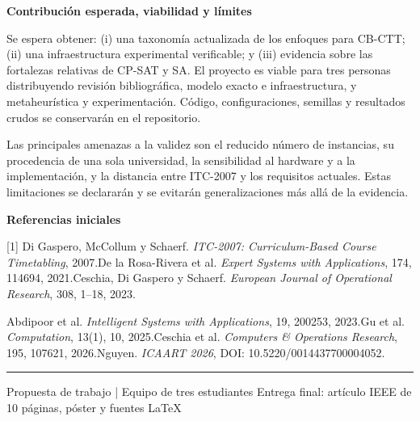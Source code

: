 \documentclass[10pt]{article}
\newcommand{\sectiontitle}[1]{%
  \vspace{1.2mm}%
  {\color{burdeos}\fontsize{11.5}{13}\selectfont\bfseries #1}\par
  \vspace{0.4mm}{\color{burdeos}\rule{\linewidth}{0.75pt}}\vspace{0.5mm}
}
\begin{document}
\begin{minipage}[t][\textheight][t]{\textwidth}
\sectiontitle{Contribuci\'on esperada, viabilidad y l\'imites}
Se espera obtener: (i) una taxonom\'ia actualizada de los enfoques para CB-CTT; (ii) una infraestructura experimental verificable; y (iii) evidencia sobre las fortalezas relativas de CP-SAT y SA. El proyecto es viable para tres personas distribuyendo revisi\'on bibliogr\'afica, modelo exacto e infraestructura, y metaheur\'istica y experimentaci\'on. C\'odigo, configuraciones, semillas y resultados crudos se conservar\'an en el repositorio.

Las principales amenazas a la validez son el reducido n\'umero de instancias, su procedencia de una sola universidad, la sensibilidad al hardware y a la implementaci\'on, y la distancia entre ITC-2007 y los requisitos actuales. Estas limitaciones se declarar\'an y se evitar\'an generalizaciones m\'as all\'a de la evidencia.

\sectiontitle{Referencias iniciales}
{\fontsize{7.25}{8.3}\selectfont\raggedright
[1] Di Gaspero, McCollum y Schaerf. \textit{ITC-2007: Curriculum-Based Course Timetabling}, 2007.\quad
[2] De la Rosa-Rivera et al. \textit{Expert Systems with Applications}, 174, 114694, 2021.\quad
[3] Ceschia, Di Gaspero y Schaerf. \textit{European Journal of Operational Research}, 308, 1--18, 2023.\par
[4] Abdipoor et al. \textit{Intelligent Systems with Applications}, 19, 200253, 2023.\quad
[5] Gu et al. \textit{Computation}, 13(1), 10, 2025.\quad
[6] Ceschia et al. \textit{Computers \& Operations Research}, 195, 107621, 2026.\quad
[7] Nguyen. \textit{ICAART 2026}, DOI: 10.5220/0014437700004052.}

\vfill
{\color{linea}\rule{\textwidth}{0.6pt}}\vspace{0.5mm}
{\color{gris}\fontsize{7.5}{8.5}\selectfont
Propuesta de trabajo | Equipo de tres estudiantes \hfill Entrega final: art\'iculo IEEE de 10 p\'aginas, p\'oster y fuentes LaTeX}

\end{minipage}
\end{document}
